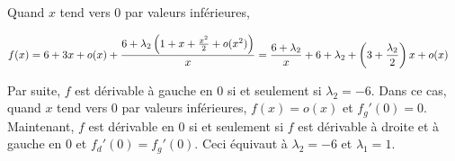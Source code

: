 {\begin{enumerate}
{Quand $x$ tend vers $0$ par valeurs inférieures,

\begin{align*}\ensuremath
f(x)&=6+3x+o(x)+ \frac{6+\lambda_2\left(1+x+ \frac{x^2}{2}+o(x^2)\right)}{x}= \frac{6+\lambda_2}{x}+6+\lambda_2+\left(3+ \frac{\lambda_2}{2}\right)x+o(x)
\end{align*}

Par suite, $f$ est dérivable à gauche en $0$ si et seulement si $\lambda_2=-6$. Dans ce cas, quand $x$ tend vers $0$ par valeurs inférieures, $f(x)=o(x)$ et $f_g'(0)=0$. Maintenant, $f$ est dérivable en $0$ si et seulement si $f$ est dérivable à droite et à gauche en $0$ et $f_d'(0)=f_g'(0)$. Ceci équivaut à $\lambda_2=-6$ et $\lambda_1=1$.

\begin{center}
\end{center}}
\end{enumerate}
}